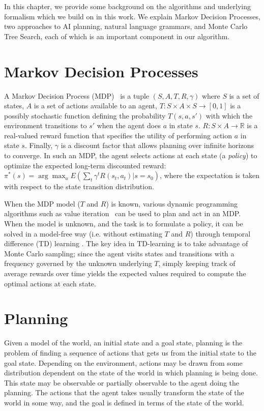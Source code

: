 In this chapter, we provide some background on the algorithms
and underlying formalism which we build on in this work.  We explain
Markov Decision Processes, two approaches to AI planning,
natural language grammars, and Monte Carlo Tree Search, each of which
is an important component in our algorithm.

\section{Markov Decision Processes}
A Markov Decision Process (MDP)~\cite{puterman_1994_markov}
is a tuple $(S, A, T, R, \gamma)$ where $S$ is a
set of states, $A$ is a set of actions available to an agent,
$T:S\times A\times S \rightarrow [0,1]$ is a possibly stochastic
function defining the probability $T(s,a,s')$ with which the
environment transitions to $s'$ when the agent does $a$ in state $s$.
$R:S\times A \rightarrow \mathbb{R}$ is a real-valued reward function that
specifies the utility of performing action $a$ in state $s$. Finally,
$\gamma$ is a discount factor that allows planning over infinite
horizons to converge. In such an MDP, the agent selects actions at
each state (a {\em policy}) to optimize the expected long-term
discounted reward: $\pi^*(s)=\arg \max_a E(\sum_t \gamma^t
R(s_t,a_t)|s=s_0)$, where the expectation is taken with respect to the
state transition distribution.

When the MDP model ($T$ and $R$) is
known, various dynamic programming algorithms such as value
iteration~\cite{bellman_1957_dynamic} can be used to plan and act in an MDP. When the
model is unknown, and the task is to formulate a policy, it can be
solved in a model-free way (i.e. without estimating $T$ and $R$)
through temporal difference (TD) learning \cite{sutton1998reinforcement}. 
The key idea in TD-learning
is to take advantage of Monte Carlo sampling; since the agent visits
states and transitions with a frequency governed by the unknown
underlying $T$, simply keeping track of average rewards over time
yields the expected values required to compute the optimal actions at
each state.


\section{Planning}
Given a model of the world, an initial state and a goal state,
planning is the problem of finding a sequence of actions that gets us 
from the initial state to the goal state.
Depending on the environment, actions may be drawn from some distribution
dependent on the state of the world in which planning is being done.  This
state may be observable or partially observable to the agent doing
the planning.  The actions that the agent takes usually transform the state of
the world in some way, and the goal is defined in terms of the state of the
world.

